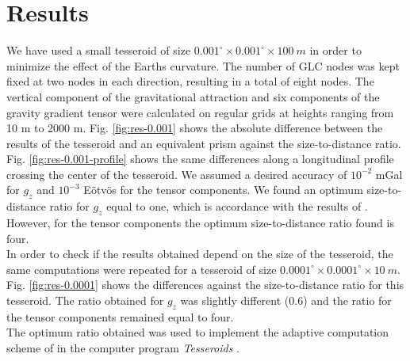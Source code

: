 \documentclass[a4paper,twocolumn]{esapub2005} %
\begin{document}
\section{Results}

We have used a small tesseroid of size $0.001^{\circ} \times 0.001^{\circ} \times 100\ m$
in order to minimize the effect of the Earths curvature.
The number of GLC nodes was kept fixed at two nodes in each direction, resulting in a
total of eight nodes.
The vertical component of the gravitational attraction and six components of the gravity
gradient tensor were calculated on regular grids at heights ranging from 10 m to 2000 m.
Fig. \ref{fig:res-0.001} shows the absolute difference between the results of the
tesseroid and an equivalent prism against the size-to-distance ratio.
Fig. \ref{fig:res-0.001-profile} shows the same differences along a longitudinal
profile crossing the center of the tesseroid.
We assumed a desired accuracy of $10^{-2}$ mGal for $g_z$ and $10^{-3}$ E\"otv\"os for
the tensor components.
We found an optimum size-to-distance ratio for $g_z$ equal to one, which is accordance
with the results of \citet{ku1977}.
However, for the tensor components the optimum size-to-distance ratio found is four.
\\[0.2cm]
In order to check if the results obtained depend on the size of the tesseroid,
the same computations were repeated for a tesseroid of size
$0.0001^{\circ} \times 0.0001^{\circ} \times 10\ m$.
Fig. \ref{fig:res-0.0001} shows the differences against the size-to-distance ratio for
this tesseroid.
The ratio obtained for $g_z$ was slightly different (0.6) and the ratio for the tensor
components remained equal to four.
\\[0.2cm]
The optimum ratio obtained was used to implement the adaptive computation scheme of
\citet{li_etal2011} in the computer program \textit{Tesseroids} \citep{uieda_etal2010}.
\end{document}

